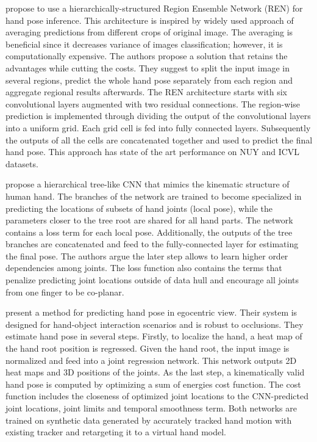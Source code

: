 \hspace{-0.4em}
\textbf{\cite{guo2017region}} 
propose to use a hierarchically-structured Region Ensemble Network (REN) for hand pose inference. This architecture is inspired by widely used approach of averaging predictions from different crops of original image. The averaging is beneficial since it decreases variance of images classification; however, it is computationally expensive. The authors propose a solution that retains the advantages while cutting the costs. They suggest to split the input image in several regions, predict the whole hand pose separately from each region and aggregate regional results afterwards. The REN architecture starts with six convolutional layers augmented with two residual connections. The region-wise prediction is implemented through dividing the output of the convolutional layers into a uniform grid. Each grid cell is fed into fully connected layers. Subsequently the outputs of all the cells are concatenated together and used to predict the final hand pose. This approach has state of the art performance on NUY and ICVL datasets.

\hspace{-0.4em}
\textbf{\cite{madadi2017end}} 
propose a hierarchical tree-like CNN that mimics the kinematic structure of human hand. The branches of the network are trained to become specialized in predicting the locations of subsets of hand joints (local pose), while the parameters closer to the tree root are shared for all hand parts. The network contains a loss term for each local pose. Additionally, the outputs of the tree branches are concatenated and feed to the fully-connected layer for estimating the final pose. The authors argue the later step allows to learn higher order dependencies among joints. The loss function also contains the terms that penalize predicting joint locations outside of data hull and encourage all joints from one finger to be co-planar.

\hspace{-0.4em}
\textbf{\cite{mueller2017real}} 
present a method for predicting hand pose in egocentric view. Their system is designed for hand-object interaction scenarios and is robust to occlusions. They estimate hand pose in several steps. Firstly, to localize the hand, a heat map of the hand root position is regressed. Given the hand root, the input image is normalized and feed into a joint regression network. This network outputs 2D heat maps and 3D positions of the joints. As the last step, a kinematically valid hand pose is computed by optimizing a sum of energies cost function. The cost function includes the closeness of optimized joint locations to the CNN-predicted joint locations, joint limits and temporal smoothness term. Both networks are trained on synthetic data generated by accurately tracked hand motion with existing tracker and retargeting it to a virtual hand model.

